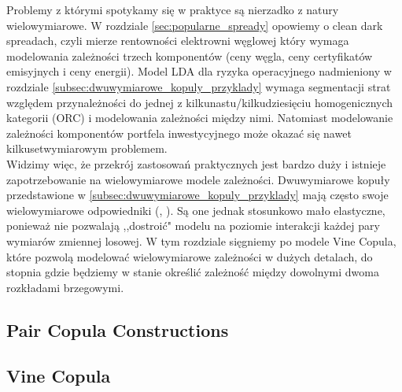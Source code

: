 Problemy z którymi spotykamy się w praktyce są nierzadko z natury wielowymiarowe. W rozdziale \ref{sec:popularne_spready} opowiemy o clean dark spreadach, czyli mierze rentowności elektrowni węglowej który wymaga modelowania zależności trzech komponentów (ceny węgla, ceny certyfikatów emisyjnych i ceny energii). Model LDA dla ryzyka operacyjnego nadmieniony w rozdziale \ref{subsec:dwuwymiarowe_kopuly_przyklady} wymaga segmentacji strat względem przynależności do jednej z kilkunastu/kilkudziesięciu homogenicznych kategorii (ORC) i modelowania zależności między nimi. Natomiast modelowanie zależności komponentów portfela inwestycyjnego może okazać się nawet kilkusetwymiarowym problemem.\\
Widzimy więc, że przekrój zastosowań praktycznych jest bardzo duży i istnieje zapotrzebowanie na wielowymiarowe modele zależności. Dwuwymiarowe kopuły przedstawione w \ref{subsec:dwuwymiarowe_kopuly_przyklady} mają często swoje wielowymiarowe odpowiedniki (\cite{Cherubini_Copula_Methods_in_Finance}, \cite{Kurowicka_Dependence_Modeling}). Są one jednak stosunkowo mało elastyczne, ponieważ nie pozwalają ,,dostroić" modelu na poziomie interakcji każdej pary wymiarów zmiennej losowej. W tym rozdziale sięgniemy po modele Vine Copula, które pozwolą modelować wielowymiarowe zależności w dużych detalach, do stopnia gdzie będziemy w stanie określić zależność między dowolnymi dwoma rozkładami brzegowymi.\\

\subsection{Pair Copula Constructions}
\label{subsec:pair_copula_constructions}

	
\subsection{Vine Copula}
\label{subsec:vine_copula}

